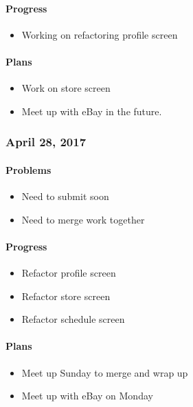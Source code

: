 \paragraph{Progress}\label{progress}
\begin{itemize}
\tightlist
\item
  Working on refactoring profile screen
\end{itemize}
\paragraph{Plans}\label{plans}
\begin{itemize}
\tightlist
\item
  Work on store screen
\item
  Meet up with eBay in the future.
\end{itemize}

\subsubsection{April 28, 2017}\label{section}
\paragraph{Problems}\label{problems}
\begin{itemize}
\tightlist
\item
  Need to submit soon
\item
  Need to merge work together
\end{itemize}
\paragraph{Progress}\label{progress}
\begin{itemize}
\tightlist
\item
  Refactor profile screen
\item
  Refactor store screen
\item
  Refactor schedule screen
\end{itemize}
\paragraph{Plans}\label{plans}
\begin{itemize}
\tightlist
\item
  Meet up Sunday to merge and wrap up
\item
  Meet up with eBay on Monday
\end{itemize}

